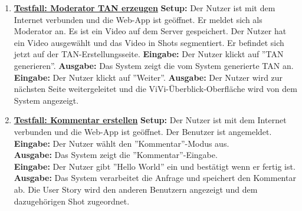 \begin{enumerate}
	\item \underline{\textbf{Testfall: Moderator TAN erzeugen}} \linebreak
	\textbf{Setup:} Der Nutzer ist mit dem Internet verbunden und die Web-App ist geöffnet. Er meldet sich als Moderator an. Es ist ein Video auf dem Server gespeichert. Der Nutzer hat ein Video ausgewählt und das Video in Shots segmentiert. Er befindet sich jetzt auf der TAN-Erstellungsseite.\linebreak
	\textbf{Eingabe:} Der Nutzer klickt auf ''TAN generieren''.\linebreak
	\textbf{Ausgabe:} Das System zeigt die vom System generierte TAN an.\linebreak
	\textbf{Eingabe:} Der Nutzer klickt auf ''Weiter''.\linebreak
	\textbf{Ausgabe:} Der Nutzer wird zur nächsten Seite weitergeleitet und die ViVi-Überblick-Oberfläche wird von dem System angezeigt.
	
	\item \underline{\textbf{Testfall: Kommentar erstellen}} \linebreak
	\textbf{Setup:} Der Nutzer ist mit dem Internet verbunden und die Web-App ist geöffnet. Der Benutzer ist angemeldet.\\
	\textbf{Eingabe:} Der Nutzer wählt den ''Kommentar''-Modus aus. \\
	\textbf{Ausgabe:} Das System zeigt die ''Kommentar''-Eingabe. \\
	\textbf{Eingabe:} Der Nutzer gibt ''Hello World'' ein und bestätigt wenn er fertig ist.\\
	\textbf{Ausgabe:} Das System verarbeitet die Anfrage und speichert den Kommentar ab. Die User Story wird den anderen Benutzern angezeigt und dem dazugehörigen Shot zugeordnet. \\
	
	

\end{enumerate}
